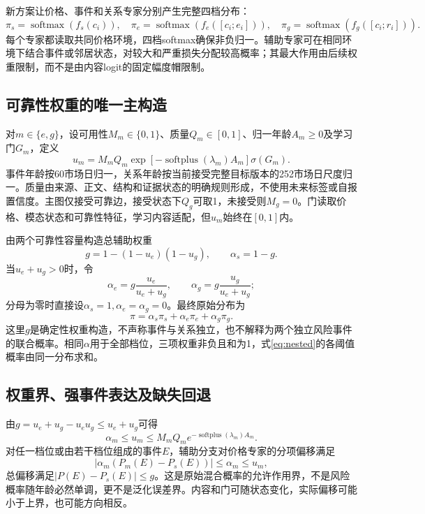 
新方案让价格、事件和关系专家分别产生完整四档分布：
\begin{equation}
 \pi_s=\operatorname{softmax}(f_s(c_i)),\quad
 \pi_e=\operatorname{softmax}(f_e([c_i;e_i])),\quad
 \pi_g=\operatorname{softmax}(f_g([c_i;r_i])).
\end{equation}
每个专家都读取共同价格环境，四档softmax确保非负归一。辅助专家可在相同环境下结合事件或邻居状态，对较大和严重损失分配较高概率；其最大作用由后续权重限制，而不是由内容logit的固定幅度帽限制。

\subsection{可靠性权重的唯一主构造}
对$m\in\{e,g\}$，设可用性$M_m\in\{0,1\}$、质量$Q_m\in[0,1]$、归一年龄$A_m\ge0$及学习门$G_m$，定义
\begin{equation}
 u_m=M_mQ_m\exp[-\operatorname{softplus}(\lambda_m)A_m]\sigma(G_m).
 \label{eq:reliability}
\end{equation}
事件年龄按60市场日归一，关系年龄按当前接受完整目标版本的252市场日尺度归一。质量由来源、正文、结构和证据状态的明确规则形成，不使用未来标签或自报置信度。主图仅接受可靠边，接受状态下$Q_g$可取1，未接受则$M_g=0$。门读取价格、模态状态和可靠性特征，学习内容适配，但$u_m$始终在$[0,1]$内。

由两个可靠性容量构造总辅助权重
\begin{equation}
 g=1-(1-u_e)(1-u_g),\qquad \alpha_s=1-g.
\end{equation}
当$u_e+u_g>0$时，令
\begin{equation}
 \alpha_e=g\frac{u_e}{u_e+u_g},\qquad
 \alpha_g=g\frac{u_g}{u_e+u_g};
 \label{eq:weights}
\end{equation}
分母为零时直接设$\alpha_s=1,\alpha_e=\alpha_g=0$。最终原始分布为
\begin{equation}
 \pi=\alpha_s\pi_s+\alpha_e\pi_e+\alpha_g\pi_g.
 \label{eq:mixture}
\end{equation}
这里$g$是确定性权重构造，不声称事件与关系独立，也不解释为两个独立风险事件的联合概率。相同$\alpha$用于全部档位，三项权重非负且和为1，式\eqref{eq:nested}的各阈值概率由同一分布求和。

\subsection{权重界、强事件表达及缺失回退}
由$g=u_e+u_g-u_eu_g\le u_e+u_g$可得
\begin{equation}
 \alpha_m\le u_m\le M_mQ_m e^{-\operatorname{softplus}(\lambda_m)A_m}.
 \label{eq:alphabound}
\end{equation}
对任一档位或由若干档位组成的事件$E$，辅助分支对价格专家的分项偏移满足
\begin{equation}
 |\alpha_m(P_m(E)-P_s(E))|\le\alpha_m\le u_m,
\end{equation}
总偏移满足$|P(E)-P_s(E)|\le g$。这是原始混合概率的允许作用界，不是风险概率随年龄必然单调，更不是泛化误差界。内容和门可随状态变化，实际偏移可能小于上界，也可能方向相反。

